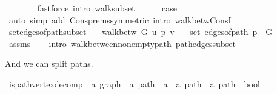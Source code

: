 \begin{isabellebody}
\ \ \ \ \ \ \isamarkupfalse%
\ {\isacharparenleft}{\kern0pt}fastforce\ intro{\isacharcolon}{\kern0pt}\ walk{\isacharunderscore}{\kern0pt}subset{\isacharparenright}{\kern0pt}\isanewline
\ \ \ \ \isamarkupfalse%
\ {\isacharquery}{\kern0pt}case\isanewline
\ \ \ \ \ \ \isamarkupfalse%
\ {\isacharparenleft}{\kern0pt}auto\ simp\ add{\isacharcolon}{\kern0pt}\ Cons{\isachardot}{\kern0pt}prems{\isacharbrackleft}{\kern0pt}symmetric{\isacharbrackright}{\kern0pt}\ intro{\isacharcolon}{\kern0pt}\ walk{\isacharunderscore}{\kern0pt}betw{\isacharunderscore}{\kern0pt}ConsI{\isacharparenright}{\kern0pt}\isanewline
\ \ \isamarkupfalse%
\isanewline
{}\isamarkupfalse%
%
\endisatagproof
{\isafoldproof}%
%
\isadelimproof
\isanewline
%
\endisadelimproof
%
\isadeliminvisible
\isanewline
%
\endisadeliminvisible
%
\isataginvisible
{}\isamarkupfalse%
\ set{\isacharunderscore}{\kern0pt}edges{\isacharunderscore}{\kern0pt}of{\isacharunderscore}{\kern0pt}path{\isacharunderscore}{\kern0pt}subset{\isacharcolon}{\kern0pt}\isanewline
\ \ \ {\isachardoublequoteopen}walk{\isacharunderscore}{\kern0pt}betw\ G\ u\ p\ v{\isachardoublequoteclose}\isanewline
\ \ \ {\isachardoublequoteopen}set\ {\isacharparenleft}{\kern0pt}edges{\isacharunderscore}{\kern0pt}of{\isacharunderscore}{\kern0pt}path\ p{\isacharparenright}{\kern0pt}\ {\isasymsubseteq}\ G{\isachardoublequoteclose}%
\endisataginvisible
{\isafoldinvisible}%
%
\isadeliminvisible
\isanewline
%
\endisadeliminvisible
%
\isadelimproof
\ \ %
\endisadelimproof
%
\isatagproof
{}\isamarkupfalse%
\ assms\isanewline
\ \ \isamarkupfalse%
\ {\isacharparenleft}{\kern0pt}intro\ walk{\isacharunderscore}{\kern0pt}between{\isacharunderscore}{\kern0pt}nonempty{\isacharunderscore}{\kern0pt}path{\isacharparenleft}{\kern0pt}{}{\isacharparenright}{\kern0pt}\ path{\isacharunderscore}{\kern0pt}edges{\isacharunderscore}{\kern0pt}subset{\isacharparenright}{\kern0pt}%
\endisatagproof
{\isafoldproof}%
%
\isadelimproof
%
\endisadelimproof
%
\begin{isamarkuptext}%
And we can split paths.%
\end{isamarkuptext}\isamarkuptrue%
\isamarkupfalse%
\ is{\isacharunderscore}{\kern0pt}path{\isacharunderscore}{\kern0pt}vertex{\isacharunderscore}{\kern0pt}decomp\ {\isacharcolon}{\kern0pt}{\isacharcolon}{\kern0pt}\ {\isachardoublequoteopen}{\isacharprime}{\kern0pt}a\ graph\ {\isasymRightarrow}\ {\isacharprime}{\kern0pt}a\ path\ {\isasymRightarrow}\ {\isacharprime}{\kern0pt}a\ {\isasymRightarrow}\ {\isacharprime}{\kern0pt}a\ path\ {\isasymtimes}\ {\isacharprime}{\kern0pt}a\ path\ {\isasymRightarrow}\ bool{\isachardoublequoteclose}\ \isanewline

\end{isabellebody}
